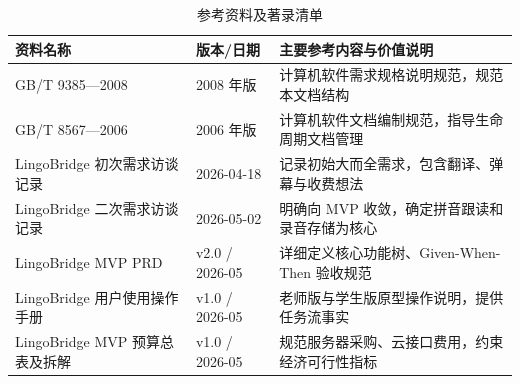 \begin{table}[H]
\centering
\caption{参考资料及著录清单}
\begin{tabularx}{\textwidth}{l p{3.5cm} X}
\toprule
\textbf{资料名称} & \textbf{版本/日期} & \textbf{主要参考内容与价值说明} \\
\midrule
GB/T 9385---2008 & 2008 年版 & 计算机软件需求规格说明规范，规范本文档结构 \\
GB/T 8567---2006 & 2006 年版 & 计算机软件文档编制规范，指导生命周期文档管理 \\
LingoBridge 初次需求访谈记录 & 2026-04-18 & 记录初始大而全需求，包含翻译、弹幕与收费想法 \\
LingoBridge 二次需求访谈记录 & 2026-05-02 & 明确向 MVP 收敛，确定拼音跟读和录音存储为核心 \\
LingoBridge MVP PRD & v2.0 / 2026-05 & 详细定义核心功能树、Given-When-Then 验收规范 \\
LingoBridge 用户使用操作手册 & v1.0 / 2026-05 & 老师版与学生版原型操作说明，提供任务流事实 \\
LingoBridge MVP 预算总表及拆解 & v1.0 / 2026-05 & 规范服务器采购、云接口费用，约束经济可行性指标 \\
\bottomrule
\end{tabularx}
\end{table}

